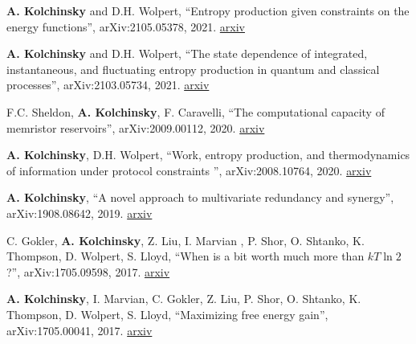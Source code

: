 
\textbf{A. Kolchinsky} and D.H. Wolpert, ``Entropy production given constraints on the energy functions'', arXiv:2105.05378, 2021. \href{http://arxiv.org/abs/2105.05378}{arxiv}


\textbf{A. Kolchinsky} and D.H. Wolpert, ``The state dependence of integrated, instantaneous, and fluctuating entropy production in quantum and classical processes'', arXiv:2103.05734, 2021. \href{http://arxiv.org/abs/2103.05734}{arxiv}


F.C. Sheldon, \textbf{A. Kolchinsky}, F. Caravelli, ``The computational capacity of memristor reservoirs'', arXiv:2009.00112, 2020. \href{http://arxiv.org/abs/2009.00112}{arxiv}


\textbf{A. Kolchinsky}, D.H. Wolpert, ``Work, entropy production, and thermodynamics of information under protocol constraints
'', arXiv:2008.10764, 2020. \href{http://arxiv.org/abs/2008.10764}{arxiv}


\textbf{A. Kolchinsky}, ``A novel approach to multivariate redundancy and synergy'', arXiv:1908.08642, 2019. \href{https://arxiv.org/abs/1908.08642}{arxiv}

C. Gokler, \textbf{A. Kolchinsky}, Z. Liu, I. Marvian , P. Shor, O. Shtanko, K. Thompson, D. Wolpert, S. Lloyd, ``When is a bit worth much more than $kT \ln 2$?'', arXiv:1705.09598, 2017. \href{https://arxiv.org/abs/1705.09598}{arxiv}

\textbf{A. Kolchinsky}, I. Marvian, C. Gokler, Z. Liu, P. Shor, O. Shtanko, K. Thompson, D. Wolpert, S. Lloyd, ``Maximizing free energy gain'', arXiv:1705.00041, 2017. \href{https://arxiv.org/abs/1705.00041}{arxiv}

